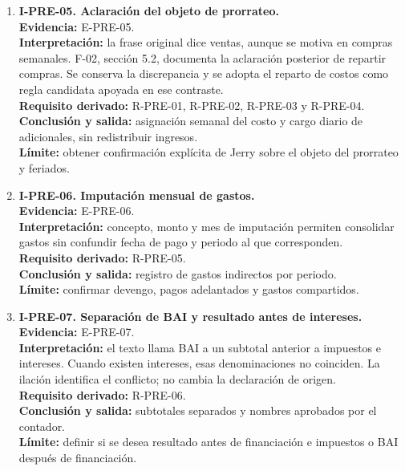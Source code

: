 \begin{enumerate}
  \item \textbf{I-PRE-05. Aclaración del objeto de prorrateo.}\\
  \textbf{Evidencia:} E-PRE-05.\\
  \textbf{Interpretación:} la frase original dice ventas, aunque se motiva
  en compras semanales. F-02, sección 5.2, documenta la aclaración posterior
  de repartir compras. Se conserva la discrepancia y se adopta el reparto de
  costos como regla candidata apoyada en ese contraste.\\
  \textbf{Requisito derivado:} R-PRE-01, R-PRE-02, R-PRE-03 y R-PRE-04.\\
  \textbf{Conclusión y salida:} asignación semanal del costo y cargo diario
  de adicionales, sin redistribuir ingresos.\\
  \textbf{Límite:} obtener confirmación explícita de Jerry sobre el objeto
  del prorrateo y feriados.

  \item \textbf{I-PRE-06. Imputación mensual de gastos.}\\
  \textbf{Evidencia:} E-PRE-06.\\
  \textbf{Interpretación:} concepto, monto y mes de imputación permiten
  consolidar gastos sin confundir fecha de pago y periodo al que
  corresponden.\\
  \textbf{Requisito derivado:} R-PRE-05.\\
  \textbf{Conclusión y salida:} registro de gastos indirectos por periodo.\\
  \textbf{Límite:} confirmar devengo, pagos adelantados y gastos
  compartidos.

  \item \textbf{I-PRE-07. Separación de BAI y resultado antes de intereses.}\\
  \textbf{Evidencia:} E-PRE-07.\\
  \textbf{Interpretación:} el texto llama BAI a un subtotal anterior a
  impuestos e intereses. Cuando existen intereses, esas denominaciones no
  coinciden. La ilación identifica el conflicto; no cambia la declaración de
  origen.\\
  \textbf{Requisito derivado:} R-PRE-06.\\
  \textbf{Conclusión y salida:} subtotales separados y nombres aprobados por
  el contador.\\
  \textbf{Límite:} definir si se desea resultado antes de financiación e
  impuestos o BAI después de financiación.


\end{enumerate}
